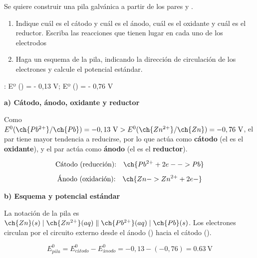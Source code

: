 \begin{exerciseEVAU}
     Se quiere construir una pila galvánica a partir de los pares  y .
    \begin{enumerate}[label=\letraminuscula]
        \item Indique cuál es el cátodo y cuál es el ánodo, cuál es el oxidante y cuál es el reductor.
        Escriba las reacciones que tienen lugar en cada uno de los electrodos
        \item Haga un esquema de la pila, indicando la dirección de circulación de los electrones
        y calcule el potencial estándar.
    \end{enumerate}
    \datos{}: Eº () = - 0,13 V; Eº () = - 0,76 V
    \begin{solu}

        \textbf{a) Cátodo, ánodo, oxidante y reductor}

        Como \(E^0(\ch{Pb^{2+}}/\ch{Pb}) = -0,13\ \si{\volt} > E^0(\ch{Zn^{2+}}/\ch{Zn}) = -0,76\ \si{\volt}\), el par  tiene mayor tendencia a reducirse, por lo que actúa como \textbf{cátodo} (el  es el \textbf{oxidante}), y el par  actúa como \textbf{ánodo} (el  es el \textbf{reductor}).

        \begin{equation*}
            \text{Cátodo (reducción):} \quad \ch{Pb^{2+} + 2 e- -> Pb}
        \end{equation*}
        \begin{equation*}
            \text{Ánodo (oxidación):} \quad \ch{Zn -> Zn^{2+} + 2 e-}
        \end{equation*}

        \textbf{b) Esquema y potencial estándar}

        La notación de la pila es \(\ch{Zn}(s) \mid \ch{Zn^{2+}}(aq) \parallel \ch{Pb^{2+}}(aq) \mid \ch{Pb}(s)\). Los electrones circulan por el circuito externo desde el ánodo () hacia el cátodo ().

        \begin{equation*}
            E^0_{pila} = E^0_{cátodo} - E^0_{ánodo} = -0,13 - (-0,76) = \SI{0.63}{\volt}
        \end{equation*}

    \end{solu}
\end{exerciseEVAU}
